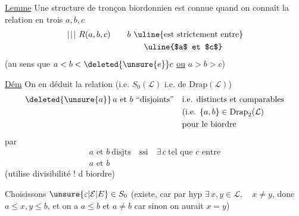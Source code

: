 \uline{Lemme} Une structure de  tronçon biordonnien est connue quand on connaît la relation en  trois  $a,b,c$
\[
\begin{aligned}
\left.\vphantom{\substack{X\\X}}\right|\!\left.\vphantom{\substack{X\\X}}\right|\!\left.\vphantom{\substack{X\\X}}\right|\, R(a,b,c)
&\qquad b\ \text{\uline{est strictement entre}}\\
&\qquad\qquad\text{\uline{$a$ et $c$}}
\end{aligned}
\]
(au sens que $a<b<\deleted{\unsure{e}}c$ \uline{ou} $a>b>c$)

\uline{Dém}  On en déduit la relation (i.e.  $S_0(\mathcal L)$\deleted{\unsure{)}} i.e. de $\mathrm{Drap}(\mathcal L)$)
\[
\begin{aligned}
\deleted{\unsure{a}}\,a\text{ et }b\ \text{``disjoints''}\quad&
\text{i.e. distincts et comparables}\\
&\text{(i.e. }\{a,b\}\in\mathrm{Drap}_2(\mathcal L)\\
&\text{pour le biordre}
\end{aligned}
\]
par 
\[
\begin{aligned}
a\text{ et }b\ \text{disjts}\quad \text{ssi}\quad
\exists\,c\ \text{tel que }c\text{ entre}\\
a\text{ et }b
\end{aligned}
\]
(utilise divisibilité ! d  biordre)

 Choisissons $\unsure{\varepsilon|\mathcal E|E}\in S_0$ (existe, car  par hyp $\exists\,x,y\in\mathcal L,\quad x\ne y$, donc $a\leq x,y\leq b$, et on a $a\leq b$ et $a\ne b$ \deleted{\unsure{)}} car sinon on aurait $x=y$)

